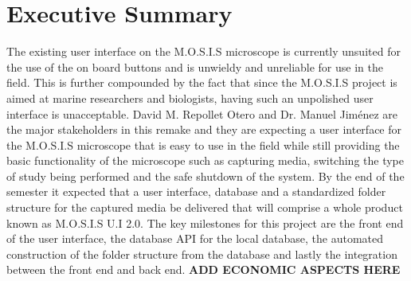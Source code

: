  \section*{Executive Summary}
 The existing user interface on the M.O.S.I.S microscope is currently unsuited for the use of the on board buttons and is unwieldy and unreliable for use in the field. This is further compounded by the fact that since the M.O.S.I.S project is aimed at marine researchers and biologists, having such an unpolished user interface is unacceptable. David M. Repollet Otero and Dr. Manuel Jiménez are the major stakeholders in this remake and they are expecting a user interface for the M.O.S.I.S microscope that is easy to use in the field while still providing the basic functionality of the microscope such as capturing media, switching the type of study being performed and the safe shutdown of the system. By the end of the semester it expected that a user interface, database and a standardized folder structure for the captured media be delivered that will comprise a whole product known as M.O.S.I.S U.I  2.0. The key milestones for this project are the front end of the user interface, the database API for the local database, the automated construction of the folder structure from the database and lastly the integration between the front end and back end. \textbf{ADD ECONOMIC ASPECTS HERE}